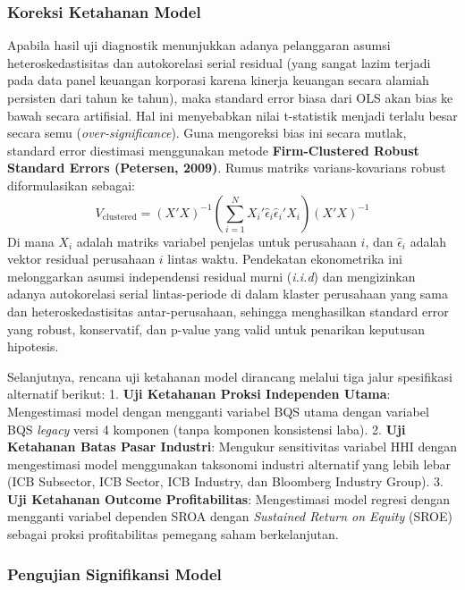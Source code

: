 \documentclass[12pt,a4paper]{article}
\begin{document}
\subsubsection{Koreksi Ketahanan Model}\label{koreksi-ketahanan-model}

Apabila hasil uji diagnostik menunjukkan adanya pelanggaran asumsi
heteroskedastisitas dan autokorelasi serial residual (yang sangat lazim
terjadi pada data panel keuangan korporasi karena kinerja keuangan
secara alamiah persisten dari tahun ke tahun), maka standard error biasa
dari OLS akan bias ke bawah secara artifisial. Hal ini menyebabkan nilai
t-statistik menjadi terlalu besar secara semu
(\emph{over-significance}). Guna mengoreksi bias ini secara mutlak,
standard error diestimasi menggunakan metode \textbf{Firm-Clustered
Robust Standard Errors (Petersen, 2009)}. Rumus matriks
varians-kovarians robust diformulasikan sebagai: \begin{equation}
V_{\mathrm{clustered}} = (X'X)^{-1} \left( \sum_{i=1}^N X_i' \hat{\epsilon}_i \hat{\epsilon}_i' X_i \right) (X'X)^{-1}
\end{equation} Di mana \(X_i\) adalah matriks variabel penjelas untuk
perusahaan \(i\), dan \(\hat{\epsilon}_i\) adalah vektor residual
perusahaan \(i\) lintas waktu. Pendekatan ekonometrika ini melonggarkan
asumsi independensi residual murni (\emph{i.i.d}) dan mengizinkan adanya
autokorelasi serial lintas-periode di dalam klaster perusahaan yang sama
dan heteroskedastisitas antar-perusahaan, sehingga menghasilkan standard
error yang robust, konservatif, dan p-value yang valid untuk penarikan
keputusan hipotesis.

Selanjutnya, rencana uji ketahanan model dirancang melalui tiga jalur
spesifikasi alternatif berikut: 1. \textbf{Uji Ketahanan Proksi
Independen Utama}: Mengestimasi model dengan mengganti variabel BQS
utama dengan variabel BQS \emph{legacy} versi 4 komponen (tanpa komponen
konsistensi laba). 2. \textbf{Uji Ketahanan Batas Pasar Industri}:
Mengukur sensitivitas variabel HHI dengan mengestimasi model menggunakan
taksonomi industri alternatif yang lebih lebar (ICB Subsector, ICB
Sector, ICB Industry, dan Bloomberg Industry Group). 3. \textbf{Uji
Ketahanan Outcome Profitabilitas}: Mengestimasi model regresi dengan
mengganti variabel dependen SROA dengan \emph{Sustained Return on
Equity} (SROE) sebagai proksi profitabilitas pemegang saham
berkelanjutan.

\subsubsection{Pengujian Signifikansi
Model}\label{pengujian-signifikansi-model}
\end{document}
